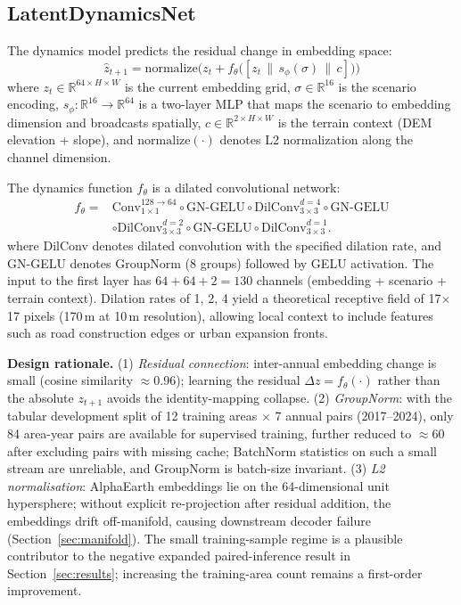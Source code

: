 \documentclass{article}
\begin{document}
\subsection{LatentDynamicsNet}
\label{sec:network}

The dynamics model predicts the residual change in embedding space:
\begin{equation}
\hat{z}_{t+1} = \text{normalize}\Big(z_t + f_\theta\big([z_t \,\|\, s_\phi(\sigma) \,\|\, c]\big)\Big)
\label{eq:dynamics}
\end{equation}
where $z_t \in \mathbb{R}^{64 \times H \times W}$ is the current embedding grid, $\sigma \in \mathbb{R}^{16}$ is the scenario encoding, $s_\phi: \mathbb{R}^{16} \to \mathbb{R}^{64}$ is a two-layer MLP that maps the scenario to embedding dimension and broadcasts spatially, $c \in \mathbb{R}^{2 \times H \times W}$ is the terrain context (DEM elevation + slope), and $\text{normalize}(\cdot)$ denotes L2 normalization along the channel dimension.

The dynamics function $f_\theta$ is a dilated convolutional network:
\begin{equation}
\begin{aligned}
f_\theta ={}& \text{Conv}_{1\times1}^{128 \to 64} \circ \text{GN-GELU}
\circ \text{DilConv}_{3\times3}^{d=4} \circ \text{GN-GELU} \\
& \circ \text{DilConv}_{3\times3}^{d=2} \circ \text{GN-GELU}
\circ \text{DilConv}_{3\times3}^{d=1}.
\end{aligned}
\end{equation}
where DilConv denotes dilated convolution with the specified dilation rate, and GN-GELU denotes GroupNorm (8 groups) followed by GELU activation. The input to the first layer has $64 + 64 + 2 = 130$ channels (embedding + scenario + terrain context). Dilation rates of 1, 2, 4 yield a theoretical receptive field of 17$\times$17 pixels (170\,m at 10\,m resolution), allowing local context to include features such as road construction edges or urban expansion fronts.

\textbf{Design rationale.} (1) \textit{Residual connection}: inter-annual embedding change is small (cosine similarity $\approx$0.96); learning the residual $\Delta z = f_\theta(\cdot)$ rather than the absolute $z_{t+1}$ avoids the identity-mapping collapse. (2) \textit{GroupNorm}: with the tabular development split of 12 training areas $\times$ 7 annual pairs (2017--2024), only 84 area-year pairs are available for supervised training, further reduced to $\approx$60 after excluding pairs with missing cache; BatchNorm statistics on such a small stream are unreliable, and GroupNorm is batch-size invariant. (3) \textit{L2 normalisation}: AlphaEarth embeddings lie on the 64-dimensional unit hypersphere; without explicit re-projection after residual addition, the embeddings drift off-manifold, causing downstream decoder failure (Section~\ref{sec:manifold}). The small training-sample regime is a plausible contributor to the negative expanded paired-inference result in Section~\ref{sec:results}; increasing the training-area count remains a first-order improvement.
\end{document}
